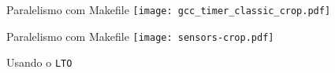 \begin{frame}
    Paralelismo com Makefile
    \texttt{[image: gcc\_timer\_classic\_crop.pdf]}
    \label{fig:analysis_classical}
\end{frame}

\begin{frame}
    Paralelismo com Makefile
    \texttt{[image: sensors-crop.pdf]}
    \label{fig:analysis_classical}
\end{frame}

\begin{frame}[standout]
    Usando o \texttt{LTO}
\end{frame}

